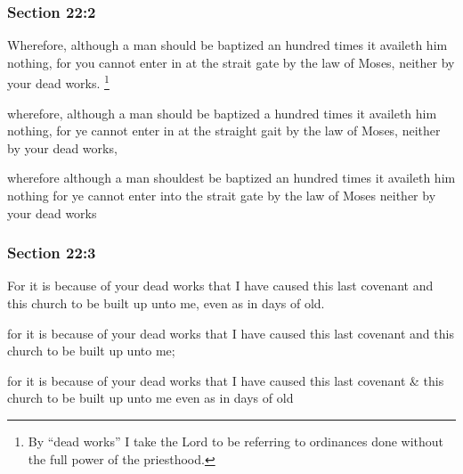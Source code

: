 	\subsubsection{Section 22:2} %
		\label{DC22-2}

		Wherefore, although a man should be baptized an hundred times it availeth him nothing, for you cannot enter in at the strait gate by the law of Moses, neither by your dead works.%
			\footnote{%
				By ``dead works'' I take the Lord to be referring to ordinances done without the full power of the priesthood.
				}

		\begin{framed}
		\scriptsize
			\begin{compactdesc}
				\item[JSP] wherefore, although a man should be baptized a hundred times it availeth him nothing, for ye cannot enter in at the straight gait by the law of Moses, neither by your dead works,
				\item[RB1] wherefore although a man shouldest be baptized an hundred times it availeth him nothing for ye cannot enter into the strait gate by the law of Moses neither by your dead works
			\end{compactdesc}
		\end{framed}

	\subsubsection{Section 22:3} %
		\label{DC22-3}

		For it is because of your dead works that I have caused this last covenant and this church to be built up unto me, even as in days of old.

		\begin{framed}
		\scriptsize
			\begin{compactdesc}
				\item[JSP] for it is because of your dead works that I have caused this last covenant and this church to be built up unto me;
				\item[RB1] for it is because of your dead works that I have caused this last covenant \& this church to be built up unto me even as in days of old
			\end{compactdesc}
		\end{framed}

